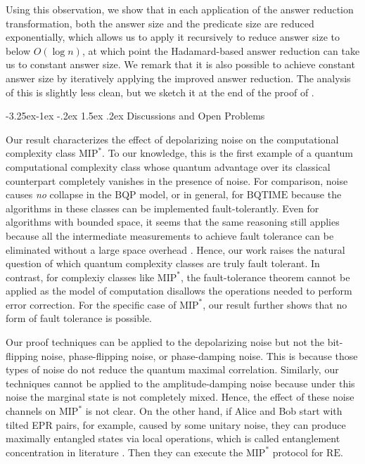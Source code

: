 \documentclass[11pt]{article}
\makeatletter
\renewcommand{\subsection}{\@startsection{subsection}{2}{\z@}%
             {-3.25ex\@plus -1ex \@minus -.2ex}%
             {1.5ex \@plus .2ex}%
             {\normalfont\large\scshape\bfseries}}
\theoremstyle{plain}
\theoremstyle{definition}
\newcommand{\1}{\mathbb{1}} %
\newcommand{\MIP}{\mathrm{MIP}}
\newcommand{\RE}{\mathrm{RE}}
\makeatother
\begin{document}
Using this observation, we show that in each application of the answer reduction transformation, both the answer size and the predicate size are reduced exponentially, which allows us to apply it recursively to reduce answer size to below $O(\log n)$, at which point the Hadamard-based answer reduction can take us to constant answer size. We remark that it is also possible to achieve constant answer size by iteratively applying the improved answer reduction. The analysis of this is slightly less clean, but we sketch it at the end of the proof of .


\subsection{Discussions and Open Problems}



Our result characterizes the effect of depolarizing noise on the computational complexity class $\MIP^\ast$.
To our knowledge, this is the first example of a quantum computational complexity class whose quantum advantage over its classical counterpart completely vanishes in the presence of noise.
For comparison, noise causes \emph{no} collapse in the $\mathrm{BQP}$ model, or in general, for $\mathrm{BQTIME}$ because the algorithms in these classes can be implemented fault-tolerantly.
Even for algorithms with bounded space, it seems that the same reasoning still applies because all the intermediate measurements to achieve fault tolerance can be eliminated without a large space overhead \cite{fefferman2021eliminating}.
Hence, our work raises the natural question of which quantum complexity classes are truly fault tolerant. 
In contrast, for complexiy classes like $\MIP^*$, the fault-tolerance theorem \cite{aharonov2008fault} cannot be applied as the model of computation disallows the operations needed to perform error correction. For the specific case of $\MIP^*$, our result further shows that no form of fault tolerance is possible. 

Our proof techniques can be applied to the depolarizing noise but not the
bit-flipping noise, phase-flipping noise, or phase-damping noise.
This is because those types of noise do not reduce the quantum maximal correlation. Similarly, our techniques cannot be applied to the amplitude-damping noise because under this noise the marginal state is not completely mixed.
Hence, the effect of these noise channels on $\MIP^*$ is not clear.
On the other hand, if Alice and Bob start with tilted EPR pairs, for example, caused by some unitary noise, they can produce maximally entangled states via local operations, which is called entanglement concentration in literature \cite{bennett1996concentrating}. Then they can execute the $\MIP^*$ protocol for $\RE$.
\end{document}
